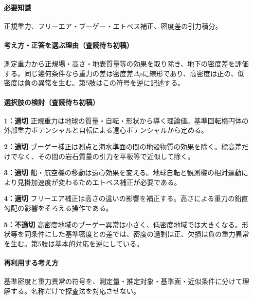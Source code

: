 \paragraph{必要知識} 正規重力、フリーエア・ブーゲー・エトベス補正、密度差の引力積分。

\paragraph{考え方・正答を選ぶ理由（査読待ち初稿）} 測定重力から正規場・高さ・地表質量等の効果を取り除き、地下の密度差を評価する。同じ幾何条件なら重力の差は密度差\(\Delta\rho\)に線形であり、高密度は正の、低密度は負の異常を生む。第5肢はこの符号を逆に記述する。

\paragraph{選択肢の検討（査読待ち初稿）}\mbox{}\par

\noindent\textbf{1：適切} 正規重力は地球の質量・自転・形状から導く理論値。基準回転楕円体の外部重力ポテンシャルと自転による遠心ポテンシャルから定める。\par

\noindent\textbf{2：適切} ブーゲー補正は測点と海水準面の間の地殻物質の効果を除く。標高差だけでなく、その間の岩石質量の引力を平板等で近似して除く。\par

\noindent\textbf{3：適切} 船・航空機の移動は遠心効果を変える。地球自転と観測機の相対運動により見掛加速度が変わるためエトベス補正が必要である。\par

\noindent\textbf{4：適切} フリーエア補正は高さの違いの影響を補正する。高さによる重力の鉛直勾配の影響をそろえる操作である。\par

\noindent\textbf{5：不適切} 高密度地域のブーゲー異常は小さく、低密度地域では大きくなる。形状等を同条件にした基準密度との差では、密度の過剰は正、欠損は負の重力異常を生む。第5肢は基本的対応を逆にしている。\par

\paragraph{再利用する考え方} 基準密度と重力異常の符号を、測定量・推定対象・基準面・近似条件に分けて理解する。名称だけで探査法を対応させない。

